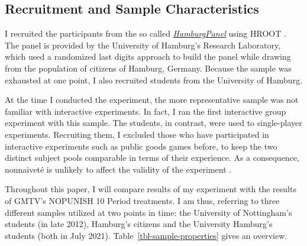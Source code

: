 \documentclass[
  authoryear,
  preprint,
  3p]{elsarticle}
\begin{document}
\hypertarget{sec-sample}{%
\subsection{Recruitment and Sample Characteristics}\label{sec-sample}}

I recruited the participants from the so called
\emph{\href{https://www.wiso.uni-hamburg.de/forschung/forschungslabor/umfragelabor/aktuelle-umfragen/hamburgpanel.html}{HamburgPanel}}
using HROOT \citep{hroot}. The panel is provided by the University of
Hamburg's Research Laboratory, which used a randomized last digits
approach to build the panel while drawing from the population of
citizens of Hamburg, Germany. Because the sample was exhausted at one
point, I also recruited students from the University of Hamburg.

At the time I conducted the experiment, the more representative sample
was not familiar with interactive experiments. In fact, I ran the first
interactive group experiment with this sample. The students, in
contrast, were used to single-player experiments. Recruiting them, I
excluded those who have participated in interactive experiments such as
public goods games before, to keep the two distinct subject pools
comparable in terms of their experience. As a consequence, nonnaiveté is
unlikely to affect the validity of the experiment \citep[
p.~204]{GoodmanPaolacci2017}.

Throughout this paper, I will compare results of my experiment with the
results of GMTV's NOPUNISH 10 Period treatments. I am thus, referring to
three different samples utilized at two points in time: the University
of Nottingham's students (in late 2012), Hamburg's citizens and the
University Hamburg's students (both in July 2021).
Table~\ref{tbl-sample-properties} gives an overview.

\hypertarget{tbl-sample-properties}{}
\begin{table}[!htbp] \centering \renewcommand*{\arraystretch}{1.1}\caption{\label{tbl-sample-properties}Sample Properties }
\end{table}
\end{document}
